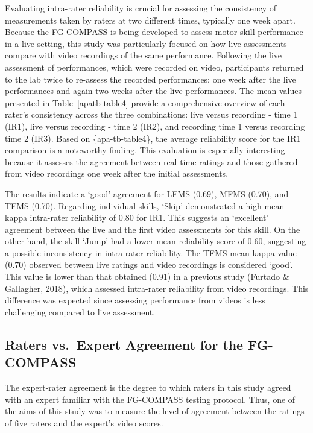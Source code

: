 \documentclass[
  man,
  colorlinks=true,linkcolor=blue,citecolor=blue,urlcolor=blue]{apa7}
\begin{document}
Evaluating intra-rater reliability is crucial for assessing the
consistency of measurements taken by raters at two different times,
typically one week apart. Because the FG-COMPASS is being developed to
assess motor skill performance in a live setting, this study was
particularly focused on how live assessments compare with video
recordings of the same performance. Following the live assessment of
performances, which were recorded on video, participants returned to the
lab twice to re-assess the recorded performances: one week after the
live performances and again two weeks after the live performances. The
mean values presented in Table~\ref{apatb-table4} provide a
comprehensive overview of each rater's consistency across the three
combinations: live versus recording - time 1 (IR1), live versus
recording - time 2 (IR2), and recording time 1 versus recording time 2
(IR3). Based on \{apa-tb-table4\}, the average reliability score for the
IR1 comparison is a noteworthy finding. This evaluation is especially
interesting because it assesses the agreement between real-time ratings
and those gathered from video recordings one week after the initial
assessments.

The results indicate a `good' agreement for LFMS (0.69), MFMS (0.70),
and TFMS (0.70). Regarding individual skills, `Skip' demonstrated a high
mean kappa intra-rater reliability of 0.80 for IR1. This suggests an
`excellent' agreement between the live and the first video assessments
for this skill. On the other hand, the skill `Jump' had a lower mean
reliability score of 0.60, suggesting a possible inconsistency in
intra-rater reliability. The TFMS mean kappa value (0.70) observed
between live ratings and video recordings is considered `good'. This
value is lower than that obtained (0.91) in a previous study (Furtado \&
Gallagher, 2018), which assessed intra-rater reliability from video
recordings. This difference was expected since assessing performance
from videos is less challenging compared to live assessment.

\hypertarget{raters-vs.-expert-agreement-for-the-fg-compass}{%
\subsection{Raters vs.~Expert Agreement for the
FG-COMPASS}\label{raters-vs.-expert-agreement-for-the-fg-compass}}

The expert-rater agreement is the degree to which raters in this study
agreed with an expert familiar with the FG-COMPASS testing protocol.
Thus, one of the aims of this study was to measure the level of
agreement between the ratings of five raters and the expert's video
scores.
\end{document}
